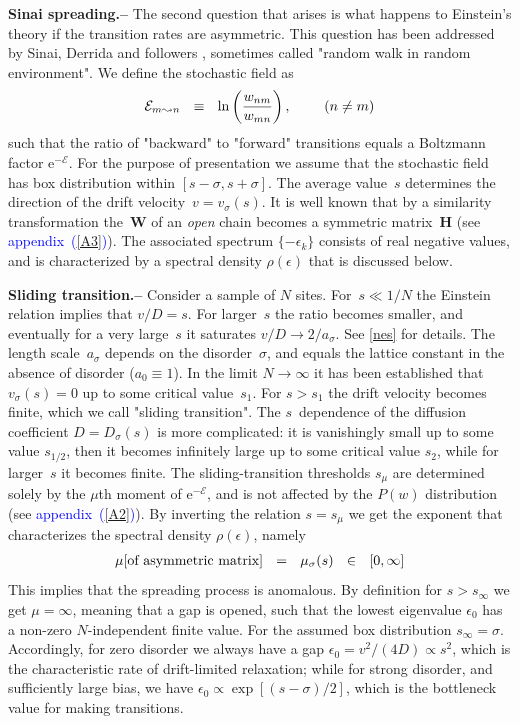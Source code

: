 \documentclass[aps,pre,floats,floatfix,twocolumn]{revtex4}
\newcommand{\eexp}[1]{\mathrm{e}^{#1}}
\newcommand{\be}[1]{\begin{eqnarray}\ifthenelse{#1=-1}{\nonumber}{\ifthenelse{#1=0}{}{\label{e#1}}}}
\newcommand{\eeq}{\end{eqnarray}}
\newcommand{\Ap}[1]{\textcolor{blue}{{appendix}\!~(\ref{#1})}}
\newcommand{\sect}[1]{{\bf #1.-- }}
\begin{document}
\sect{Sinai spreading}
%
The second question that arises is what happens to Einstein's theory if the transition rates are asymmetric.
This question has been addressed by Sinai, Derrida and followers \cite{Sinai,odh1},
sometimes called "random walk in random environment". We define the stochastic field as
%
\be{6}
\mathcal{E}_{m \leadsto n} \ \ \equiv \ \ \ln\left(\frac{w_{nm}}{w_{mn}}\right), \ \ \ \ \ \ \  (n \neq m)   
\eeq
%
such that the ratio of "backward" to "forward" transitions equals a Boltzmann factor ${\eexp{-\mathcal{E}}}$. 
For the purpose of presentation we assume that the stochastic field has box distribution within ${[s-\sigma,s+\sigma]}$. 
The average value~$s$ determines the direction of the drift velocity~$v=v_{\sigma}(s)$. 
It is well known that by a similarity transformation the~$\bm{W}$ of an {\em open} chain becomes a symmetric matrix~$\bm{H}$ (see \Ap{A3}).     
The associated spectrum ${\{-\epsilon_k\}}$ consists of real negative values, and is characterized by 
a spectral density $\rho(\epsilon)$ that is discussed below.   


\sect{Sliding transition}
%
Consider a sample of $N$ sites. For~${s\ll 1/N}$ the Einstein relation implies that $v/D=s$. 
For larger~$s$ the ratio becomes smaller, and eventually for a very large~$s$ it saturates $v/D\rightarrow 2/a_{\sigma}$.  See \ref{nes} for details.
The length scale~$a_{\sigma}$ depends on the disorder~$\sigma$, 
and equals the lattice constant in the absence of disorder (${a_0 \equiv 1}$). 
%
In the limit $N\rightarrow\infty$ it has been established that $v_{\sigma}(s)=0$ 
up to some critical value~${s_1}$. For ${s>s_1}$ the drift velocity becomes finite, 
which we call "sliding transition".  
The $s$~dependence of the diffusion coefficient $D=D_{\sigma}(s)$ is more complicated:  
it is vanishingly small up to some value $s_{1/2}$, 
then it becomes infinitely large up to some critical value ${s_2}$, 
while for larger~$s$ it becomes finite. 
%
The sliding-transition thresholds $s_{\mu}$ 
are determined solely by the $\mu$th moment of $\eexp{-\mathcal{E}}$, 
and is not affected by the ${P(w)}$ distribution (see \Ap{A2}). 
By inverting the  relation ${s=s_{\mu}}$   
we get the exponent that characterizes the spectral density $\rho(\epsilon)$, namely  
%
\be{7}
\mu [\text{of asymmetric matrix}] \ \ = \ \ \mu_{\sigma}(s) \ \ \in  \ \ [0,\infty] 
\eeq
%
This implies that the spreading process is anomalous.  
By definition for ${s>s_{\infty}}$ we get ${\mu=\infty}$, 
meaning that a gap is opened, such that the lowest eigenvalue $\epsilon_0$ 
has a non-zero $N$-independent finite value. 
%
For the assumed box distribution ${s_{\infty}=\sigma}$. 
Accordingly, for zero disorder we always have a gap ${\epsilon_0 = v^2/(4D) \propto s^2}$,  
which is the characteristic rate of drift-limited relaxation;   
while for strong disorder, and sufficiently large bias,  
we have ${\epsilon_0 \propto \exp[(s-\sigma)/2]}$,  
which is the bottleneck value for making transitions. 
\end{document}
